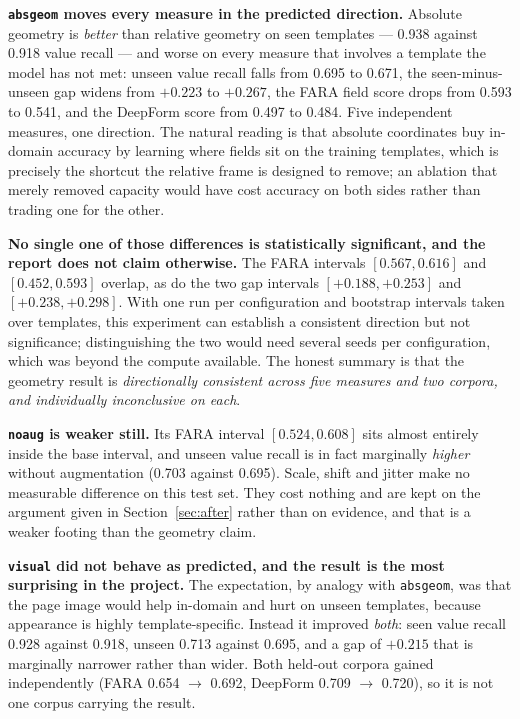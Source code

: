 \documentclass[11pt,a4paper]{article}
\newcommand{\code}[1]{\texttt{\small #1}}
\begin{document}
\textbf{\code{absgeom} moves every measure in the predicted direction.} Absolute geometry is
\emph{better} than relative geometry on seen templates --- 0.938 against 0.918 value recall ---
and worse on every measure that involves a template the model has not met: unseen value recall
falls from 0.695 to 0.671, the seen-minus-unseen gap widens from $+0.223$ to $+0.267$, the FARA
field score drops from 0.593 to 0.541, and the DeepForm score from 0.497 to 0.484. Five
independent measures, one direction. The natural reading is that absolute coordinates buy
in-domain accuracy by learning where fields sit on the training templates, which is precisely the
shortcut the relative frame is designed to remove; an ablation that merely removed capacity would
have cost accuracy on both sides rather than trading one for the other.

\textbf{No single one of those differences is statistically significant, and the report does not
claim otherwise.} The FARA intervals $[0.567, 0.616]$ and $[0.452, 0.593]$ overlap, as do the two
gap intervals $[+0.188, +0.253]$ and $[+0.238, +0.298]$. With one run per configuration and
bootstrap intervals taken over templates, this experiment can establish a consistent direction but
not significance; distinguishing the two would need several seeds per configuration, which was
beyond the compute available. The honest summary is that the geometry result is
\emph{directionally consistent across five measures and two corpora, and individually
inconclusive on each}.

\textbf{\code{noaug} is weaker still.} Its FARA interval $[0.524, 0.608]$ sits almost entirely
inside the base interval, and unseen value recall is in fact marginally \emph{higher} without
augmentation (0.703 against 0.695). Scale, shift and jitter make no measurable difference on this
test set. They cost nothing and are kept on the argument given in Section~\ref{sec:after} rather
than on evidence, and that is a weaker footing than the geometry claim.

\textbf{\code{visual} did not behave as predicted, and the result is the most surprising in the
project.} The expectation, by analogy with \code{absgeom}, was that the page image would help
in-domain and hurt on unseen templates, because appearance is highly template-specific. Instead it
improved \emph{both}: seen value recall 0.928 against 0.918, unseen 0.713 against 0.695, and a gap
of $+0.215$ that is marginally narrower rather than wider. Both held-out corpora gained
independently (FARA 0.654 $\to$ 0.692, DeepForm 0.709 $\to$ 0.720), so it is not one corpus
carrying the result.
\end{document}
